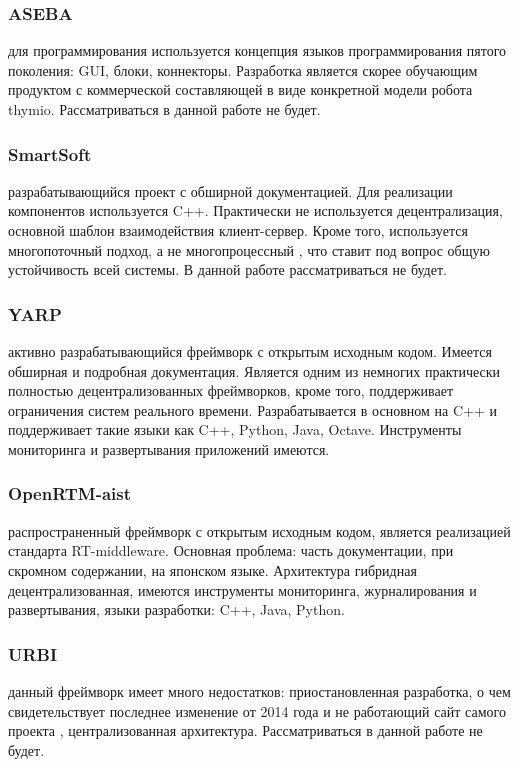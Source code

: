 \subsubsection{ASEBA} для программирования используется концепция языков программирования пятого поколения: GUI, блоки, коннекторы. Разработка является скорее обучающим продуктом с коммерческой составляющей в виде конкретной модели робота thymio. Рассматриваться в данной работе не будет. \cite{aseba-site}

\subsubsection{SmartSoft} разрабатывающийся проект с обширной документацией. Для реализации компонентов используется C++. Практически не используется децентрализация, основной шаблон взаимодействия клиент-сервер. Кроме того, используется многопоточный подход, а не многопроцессный \cite{smartsoft-man}, что ставит под вопрос общую устойчивость всей системы. В данной работе рассматриваться не будет.

\subsubsection{YARP} активно разрабатывающийся фреймворк с открытым исходным кодом. Имеется обширная и подробная документация. Является одним из немногих практически полностью децентрализованных фреймворков, кроме того, поддерживает ограничения систем реального времени. Разрабатывается в основном на C++ и поддерживает такие языки как C++, Python, Java, Octave. Инструменты мониторинга и развертывания приложений имеются. \cite{yarp-man}

\subsubsection{OpenRTM-aist} распространенный фреймворк с открытым исходным кодом, является реализацией стандарта RT-middleware. Основная проблема: часть документации, при скромном содержании, на японском языке. Архитектура гибридная децентрализованная, имеются инструменты мониторинга, журналирования и развертывания, языки разработки: C++, Java, Python. \cite{openrtmaist-man}

\subsubsection{URBI} данный фреймворк имеет много недостатков: приостановленная разработка, о чем свидетельствует последнее изменение от 2014 года \cite{urbi-repo} и не работающий сайт самого проекта \cite{urbi-site}, централизованная архитектура. Рассматриваться в данной работе не будет. 


